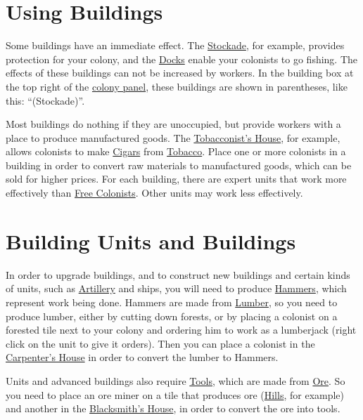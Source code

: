 \documentclass[12pt]{book}
\begin{document}
\hypertarget{Using Buildings}{\section{{Using Buildings}}}

Some buildings have an immediate effect. The
\hyperlink{Stockade}{Stockade}, for example, provides protection for
your colony, and the \hyperlink{Dock}{Docks} enable your colonists to
go fishing. The effects of these buildings can not be increased by
workers. In the building box at the top right of the \hyperlink{colony
panel}{colony panel}, these buildings are shown in parentheses, like
this: ``(Stockade)''.

Most buildings do nothing if they are unoccupied, but provide workers
with a place to produce manufactured goods. The
\hyperlink{Tobacconist's House}{Tobacconist's House}, for example,
allows colonists to make \hyperlink{Cigars}{Cigars} from
\hyperlink{Tobacco}{Tobacco}. Place one or more colonists in a
building in order to convert raw materials to manufactured goods,
which can be sold for higher prices. For each building, there are
expert units that work more effectively than \hyperlink{Free
  Colonist}{Free Colonists}. Other units may work less effectively.


\hypertarget{Building Units and Buildings}{\section{Building Units 
and Buildings}}

In order to upgrade buildings, and to construct new buildings and
certain kinds of units, such as \hyperlink{Artillery}{Artillery} and
ships, you will need to produce \hyperlink{Hammers}{Hammers}, which
represent work being done. Hammers are made from
\hyperlink{Lumber}{Lumber}, so you need to produce lumber, either by
cutting down forests, or by placing a colonist on a forested tile next
to your colony and ordering him to work as a lumberjack (right click
on the unit to give it orders). Then you can place a colonist in the
\hyperlink{Carpenter's House}{Carpenter's House} in order to convert
the lumber to Hammers.

Units and advanced buildings also require \hyperlink{Tools}{Tools},
which are made from \hyperlink{Ore}{Ore}. So you need to place an ore
miner on a tile that produces ore (\hyperlink{Hills}{Hills}, for
example) and another in the \hyperlink{Blacksmith's
House}{Blacksmith's House}, in order to convert the ore into tools.
\end{document}

